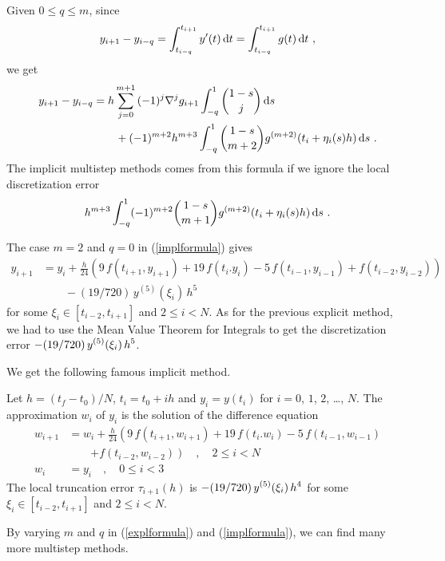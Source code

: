 Given $0\leq q \leq m$, since
\[
y_{i+1} - y_{i-q} = \int_{t_{i-q}}^{t_{i+1}} y'(t)\,\mathrm{d}t
= \int_{t_{i-q}}^{t_{i+1}} g(t)\,\mathrm{d}t \ ,
\]
we get
\begin{equation} \label{implformula}
\begin{split} 
y_{i+1} - y_{i-q} &= 
h \sum_{j=0}^{m+1}\,(-1)^j \nabla^j g_{i+1} \int_{-q}^1  \binom{1-s}{j}
\,\mathrm{d}s \\
& \qquad + (-1)^{m+2} h^{m+3} \int_{-q}^1 \binom{1-s}{m+2}
g^{(m+2)}(t_i+\eta_i(s)h) \,\mathrm{d}s \ .
\end{split}
\end{equation}
The implicit multistep methods comes from this formula if we ignore
the local discretization error
\[
h^{m+3} \int_{-q}^1 (-1)^{m+2} \binom{1-s}{m+1}
g^{(m+2)}(t_i+\eta_i(s)h) \,\mathrm{d}s \ .
\]

The case $m=2$ and $q=0$ in (\ref{implformula}) gives
\begin{align*}
y_{i+1} & = y_i + \frac{h}{24} \left( 9\, f(t_{i+1},y_{i+1}) + 19 \,
f(t_i.y_i) - 5 \,f(t_{i-1},y_{i-1}) + f(t_{i-2},y_{i-2})\right) \\
&\qquad  -(19/720) \,y^{(5)}(\xi_i)\,h^5
\end{align*}
for some $\xi_i \in [t_{i-2},t_{i+1}]$ and $2 \leq i < N$.
As for the previous explicit method, we had to use the Mean Value
Theorem for Integrals to get the discretization error
$\displaystyle -(19/720) \,y^{(5)}(\xi_i)\,h^5$.

We get the following famous implicit method.

\begin{defn}
Let $h=(t_f-t_0)/N$, $t_i=t_0+ih$ and $y_i = y(t_i)$ for $i=0$,
$1$, $2$, \ldots, $N$.  The approximation $w_i$ of $y_i$ is the
solution of the difference equation
\begin{align*}
w_{i+1} & = w_i + \frac{h}{24} \left( 9\, f(t_{i+1},w_{i+1}) + 19 \,
f(t_i.w_i)  - 5 \,f(t_{i-1},w_{i-1}) \right . \\
& \qquad \left. + f(t_{i-2},w_{i-2})\right) \quad, \quad 2 \leq i < N \\
w_i &= y_i \quad, \quad 0 \leq i < 3
\end{align*}
The local truncation error $\tau_{i+1}(h)$ is
$\displaystyle -(19/720) \,y^{(5)}(\xi_i)\,h^4$ for some
$\xi_i \in [t_{i-2},t_{i+1}]$ and $2 \leq i < N$.
\label{AMTSM}
\end{defn}

By varying $m$ and $q$ in (\ref{explformula}) and
(\ref{implformula}), we can find many more multistep methods.

